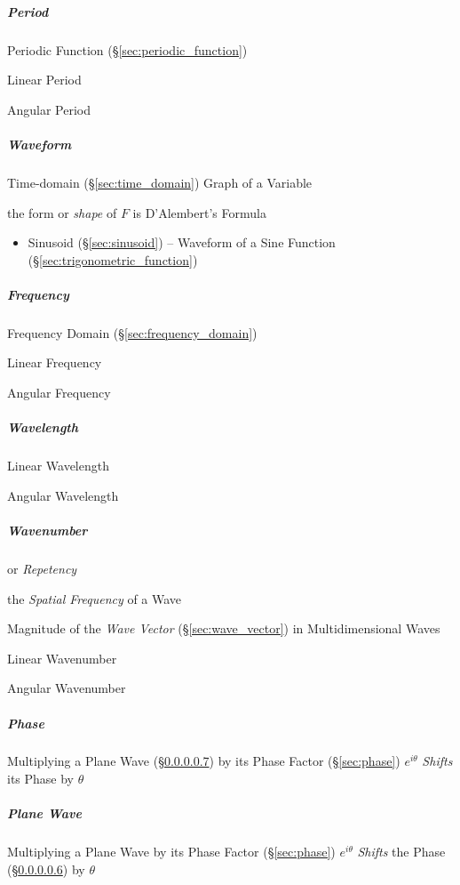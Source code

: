 \subparagraph{Period}\label{sec:period}\hfill

\fist Periodic Function (\S\ref{sec:periodic_function})

Linear Period

Angular Period



\subparagraph{Waveform}\label{sec:waveform}\hfill

Time-domain (\S\ref{sec:time_domain}) Graph of a Variable

the form or \emph{shape} of $F$ is D'Alembert's Formula

\begin{itemize}
  \item Sinusoid (\S\ref{sec:sinusoid}) -- Waveform of a Sine Function
    (\S\ref{sec:trigonometric_function})
\end{itemize}



\subparagraph{Frequency}\label{sec:frequency}\hfill

\fist Frequency Domain (\S\ref{sec:frequency_domain})

Linear Frequency

Angular Frequency



\subparagraph{Wavelength}\label{sec:wavenumber}\hfill

Linear Wavelength

Angular Wavelength



\subparagraph{Wavenumber}\label{sec:wavenumber}\hfill

or \emph{Repetency}

the \emph{Spatial Frequency} of a Wave

Magnitude of the \emph{Wave Vector} (\S\ref{sec:wave_vector}) in
Multidimensional Waves

Linear Wavenumber

Angular Wavenumber



\subparagraph{Phase}\label{sec:wave_phase}\hfill

Multiplying a Plane Wave (\S\ref{sec:plane_wave}) by its Phase Factor
(\S\ref{sec:phase}) $e^{i\theta}$ \emph{Shifts} its Phase by $\theta$



\subparagraph{Plane Wave}\label{sec:plane_wave}\hfill

Multiplying a Plane Wave by its Phase Factor (\S\ref{sec:phase}) $e^{i\theta}$
\emph{Shifts} the Phase (\S\ref{sec:wave_phase}) by $\theta$



